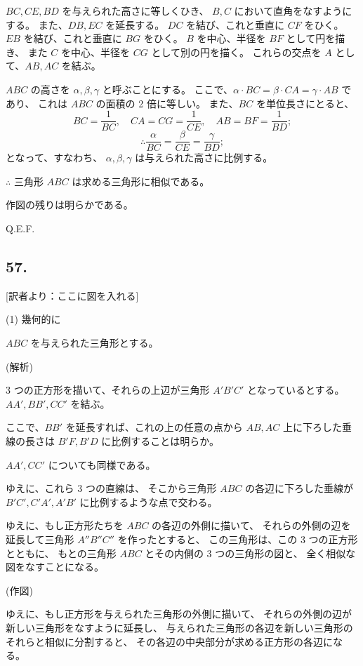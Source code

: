 $BC, CE, BD$ を与えられた高さに等しくひき、
$B, C$ において直角をなすようにする。
また、$DB, EC$ を延長する。
$DC$ を結び、これと垂直に $CF$ をひく。
$EB$ を結び、これと垂直に $BG$ をひく。
$B$ を中心、半径を $BF$ として円を描き、
また $C$ を中心、半径を $CG$ として別の円を描く。
これらの交点を $A$ として、$AB, AC$ を結ぶ。

$ABC$ の高さを $\alpha, \beta, \gamma$ と呼ぶことにする。
ここで、$\alpha \cdot BC = \beta \cdot CA = \gamma \cdot AB$ であり、
これは $ABC$ の面積の 2 倍に等しい。
また、$BC$ を単位長さにとると、
\[
BC = \frac{1}{BC},
\quad
CA = CG = \frac{1}{CE},
\quad
AB = BF = \frac{1}{BD};
\]
\[
\therefore
\frac{\alpha}{BC} = \frac{\beta}{CE} = \frac{\gamma}{BD};
\]
となって、すなわち、
$\alpha, \beta, \gamma$ は与えられた高さに比例する。

$\therefore$
三角形 $ABC$ は求める三角形に相似である。

作図の残りは明らかである。

Q.E.F.

\subsection*{57.}

[訳者より：ここに図を入れる] 

(1) 幾何的に

$ABC$ を与えられた三角形とする。

(解析)

3 つの正方形を描いて、それらの上辺が三角形 $A'B'C'$ となっているとする。
$AA', BB', CC'$ を結ぶ。

ここで、$BB'$ を延長すれば、これの上の任意の点から $AB, AC$
上に下ろした垂線の長さは $B'F, B'D$ に比例することは明らか。

$AA', CC'$ についても同様である。

ゆえに、これら 3 つの直線は、
そこから三角形 $ABC$ の各辺に下ろした垂線が $B'C', C'A', A'B'$
に比例するような点で交わる。

ゆえに、もし正方形たちを $ABC$ の各辺の外側に描いて、
それらの外側の辺を延長して三角形 $A''B''C''$ を作ったとすると、
この三角形は、この 3 つの正方形とともに、
もとの三角形 $ABC$ とその内側の 3 つの三角形の図と、
全く相似な図をなすことになる。

(作図)

ゆえに、もし正方形を与えられた三角形の外側に描いて、
それらの外側の辺が新しい三角形をなすように延長し、
与えられた三角形の各辺を新しい三角形のそれらと相似に分割すると、
その各辺の中央部分が求める正方形の各辺になる。

